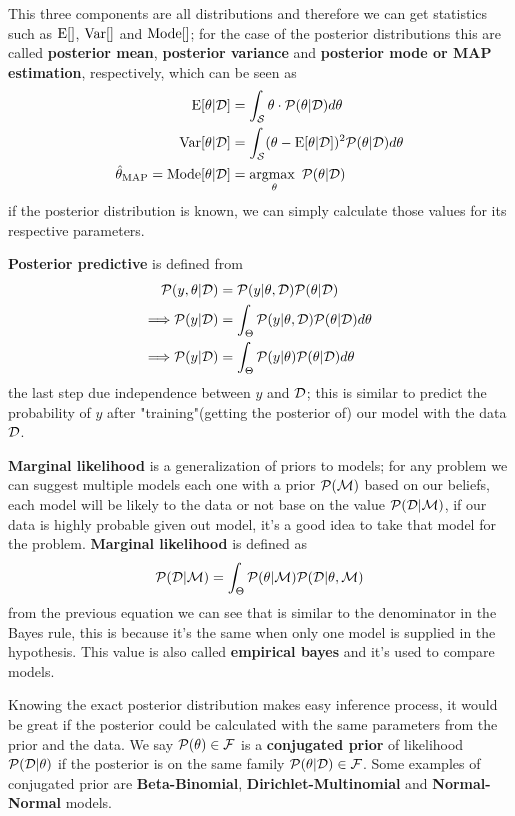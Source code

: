 \documentclass[../../main.tex]{subfiles}
\begin{document}
This three components are all distributions and therefore we can get statistics such as $\mathrm{E}[]$, $\mathrm{Var}[]$ and $\mathrm{Mode}[]$; for the case of the posterior distributions this are called \textbf{posterior mean}, \textbf{posterior variance} and \textbf{posterior mode or MAP estimation}, respectively, which can be seen as
\begin{align*}
    \mathrm{E}[\theta|\mathcal{D}] &= \int_\mathcal{S} \theta \cdot \mathcal{P}(\theta|\mathcal{D})d\theta\\
    \mathrm{Var}[\theta|\mathcal{D}] &= \int_\mathcal{S} (\theta-\mathrm{E}[\theta|\mathcal{D}])^2 \mathcal{P}(\theta|\mathcal{D})d\theta\\
    \hat{\theta}_\mathrm{MAP} = \mathrm{Mode}[\theta|\mathcal{D}] &= \operatorname*{argmax\text{ }}_\theta \mathcal{P}(\theta|\mathcal{D})
\end{align*}
if the posterior distribution is known, we can simply calculate those values for its respective parameters.

\textbf{Posterior predictive} is defined from
\begin{align*}
    \mathcal{P}(y,\theta|\mathcal{D}) &= \mathcal{P}(y|\theta,\mathcal{D})\mathcal{P}(\theta|\mathcal{D})\\
    \Longrightarrow \mathcal{P}(y|\mathcal{D}) &= \int_\Theta \mathcal{P}(y|\theta,\mathcal{D})\mathcal{P}(\theta|\mathcal{D})d\theta\\
    \Longrightarrow \mathcal{P}(y|\mathcal{D}) &= \int_\Theta \mathcal{P}(y|\theta)\mathcal{P}(\theta|\mathcal{D})d\theta
\end{align*}
the last step due independence between $y$ and $\mathcal{D}$; this is similar to predict the probability of $y$ after "training"(getting the posterior of) our model with the data $\mathcal{D}$.

\textbf{Marginal likelihood} is a generalization of priors to models; for any problem we can suggest multiple models each one with a prior $\mathcal{P}(\mathcal{M})$ based on our beliefs, each model will be likely to the data or not base on the value $\mathcal{P}(\mathcal{D}|\mathcal{M})$, if our data is highly probable given out model, it's a good idea to take that model for the problem. \textbf{Marginal likelihood} is defined as
\begin{equation*}
    \mathcal{P}(\mathcal{D}|\mathcal{M}) = \int_\Theta \mathcal{P}(\theta|\mathcal{M})\mathcal{P}(\mathcal{D}|\theta,\mathcal{M})
\end{equation*}
from the previous equation we can see that is similar to the denominator in the Bayes rule, this is because it's the same when only one model is supplied in the hypothesis. This value is also called \textbf{empirical bayes} and it's used to compare models.

Knowing the exact posterior distribution makes easy inference process, it would be great if the posterior could be calculated with the same parameters from the prior and the data. We say $\mathcal{P}(\theta)\in\mathcal{F}$ is a \textbf{conjugated prior} of likelihood $\mathcal{P}(\mathcal{D}|\theta)$ if the posterior is on the same family $\mathcal{P}(\theta|\mathcal{D})\in\mathcal{F}$. Some examples of conjugated prior are \textbf{Beta-Binomial}, \textbf{Dirichlet-Multinomial} and \textbf{Normal-Normal} models.
\end{document}
